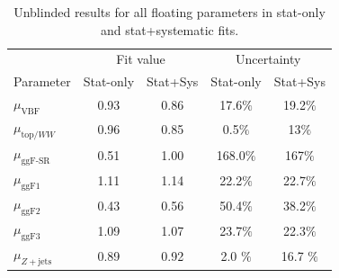 \begin{table}[!h]
  \begin{center}
    \begin{tabular}{l|c|c|c|c|}
        & \multicolumn{2}{|c|}{Fit value} & \multicolumn{2}{|c|}{Uncertainty} \\
       Parameter & Stat-only & Stat+Sys & Stat-only & Stat+Sys \\
      \hline
       $\mu_{\text{VBF}}$ & 0.93 & 0.86 & 17.6$\%$ & 19.2$\%$ \\
       $\mu_{\text{top/}WW}$ & 0.96 & 0.85 & 0.5$\%$ & 13$\%$ \\
       $\mu_{\text{ggF-SR}}$ & 0.51 & 1.00 & 168.0$\%$ & 167$\%$ \\
       $\mu_{\text{ggF1}}$ & 1.11 & 1.14 & 22.2$\%$ & 22.7$\%$ \\
       $\mu_{\text{ggF2}}$ & 0.43 & 0.56 & 50.4$\%$ & 38.2$\%$ \\
       $\mu_{\text{ggF3}}$ & 1.09 & 1.07 & 23.7$\%$ & 22.3$\%$ \\
       $\mu_{Z+\text{jets}}$& 0.89 & 0.92 & 2.0 $\%$ & 16.7 $\%$ \\
    \end{tabular}
    \caption{Unblinded results for all floating parameters in stat-only and stat+systematic fits.}
    \label{tab:datamuresults}
  \end{center}
\end{table}
%

